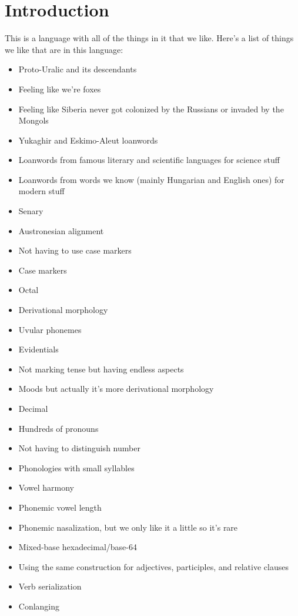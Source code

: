 \chapter{Introduction}
This is a language with all of the things in it that we like. Here's a list of
things we like that are in this language:
\begin{itemize}
  \item Proto-Uralic and its descendants
  \item Feeling like we're foxes
  \item Feeling like Siberia never got colonized by the Russians or invaded by
    the Mongols
  \item Yukaghir and Eskimo-Aleut loanwords
  \item Loanwords from famous literary and scientific languages for science
    stuff
  \item Loanwords from words we know (mainly Hungarian and English ones) for
    modern stuff
  \item Senary
  \item Austronesian alignment
  \item Not having to use case markers
  \item Case markers
  \item Octal
  \item Derivational morphology
  \item Uvular phonemes
  \item Evidentials
  \item Not marking tense but having endless aspects
  \item Moods but actually it's more derivational morphology
  \item Decimal
  \item Hundreds of pronouns
  \item Not having to distinguish number
  \item Phonologies with small syllables
  \item Vowel harmony
  \item Phonemic vowel length
  \item Phonemic nasalization, but we only like it a little so it's rare
  \item Mixed-base hexadecimal/base-64
  \item Using the same construction for adjectives, participles, and relative
    clauses
  \item Verb serialization
  \item Conlanging
\end{itemize}
